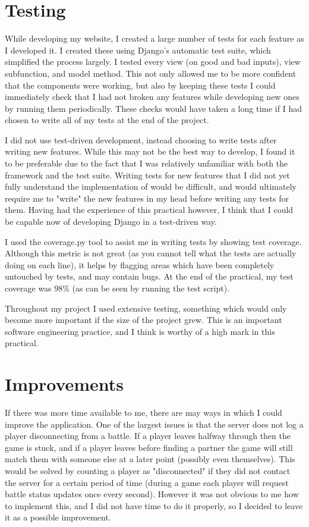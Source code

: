 \documentclass{article}
\begin{document}
\section{Testing}

While developing my website, I created a large number of tests for each feature as I developed it. I created these using Django's automatic test suite, which simplified the process largely. I tested every view (on good and bad inputs), view subfunction, and model method. This not only allowed me to be more confident that the components were working, but also by keeping these tests I could immediately check that I had not broken any features while developing new ones by running them periodically. These checks would have taken a long time if I had chosen to write all of my tests at the end of the project.

I did not use test-driven development, instead choosing to write tests after writing new features. While this may not be the best way to develop, I found it to be preferable due to the fact that I was relatively unfamiliar with both the framework and the test suite. Writing tests for new features that I did not yet fully understand the implementation of would be difficult, and would ultimately require me to "write" the new features in my head before writing any tests for them. Having had the experience of this practical however, I think that I could be capable now of developing Django in a test-driven way.

I used the coverage.py tool to assist me in writing tests by showing test coverage. Although this metric is not great (as you cannot tell what the tests are actually doing on each line), it helps by flagging areas which have been completely untouched by tests, and may contain bugs. At the end of the practical, my test coverage was 98\% (as can be seen by running the test script).

Throughout my project I used extensive testing, something which would only become more important if the size of the project grew. This is an important software engineering practice, and I think is worthy of a high mark in this practical.

\section{Improvements}

If there was more time available to me, there are may ways in which I could improve the application. One of the largest issues is that the server does not log a player disconnecting from a battle. If a player leaves halfway through then the game is stuck, and if a player leaves before finding a partner the game will still match them with someone else at a later point (possibly even themselves). This would be solved by counting a player as "disconnected" if they did not contact the server for a certain period of time (during a game each player will  request battle status updates once every second). However it was not obvious to me how to implement this, and I did not have time to do it properly, so I decided to leave it as a possible improvement.
\end{document}
